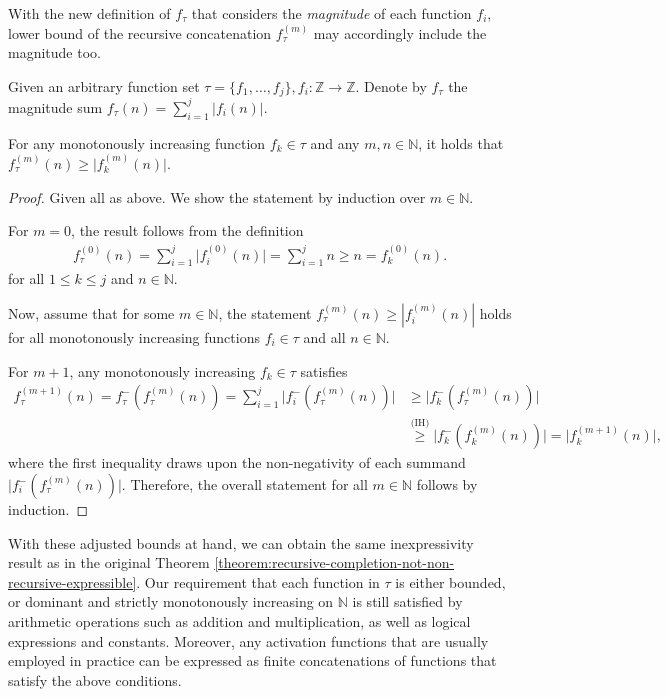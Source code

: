 With the new definition of $f_{\tau}$ that considers the \textit{magnitude} of each function $f_i$, lower bound of the recursive concatenation $f_{\tau}^{(m)}$ may accordingly include the magnitude too.
\begin{lemma}
	\label{lemma:max-bound-recursive-concatenation-sum-integer}
	Given an arbitrary function set $\tau=\{f_1,\dots,f_j\},f_i:\mathbb{Z}\to\mathbb{Z}$.
	Denote by $f_{\tau}$ the magnitude sum $f_{\tau}(n)=\sum_{i=1}^{j} \bigl|f_i(n)\bigr|$.
	
	For any monotonously increasing function $f_k\in\tau$ and any $m,n\in\mathbb{N}$, it holds that
	$f_{\tau}^{(m)}(n)\geq \bigl|f_k^{(m)}(n)\bigr|$.
\end{lemma}
\begin{proof}
	Given all as above.
	We show the statement by induction over $m\in\mathbb{N}$.
	
	For $m=0$, the result follows from the definition
	\begin{align*}
		f_{\tau}^{(0)}(n)=\sum_{i=1}^{j} \bigl|f_{i}^{(0)}(n)\bigr|=\sum_{i=1}^{j}n\geq n=f_{k}^{(0)}(n).
	\end{align*}
	for all $1\leq k\leq j$ and $n\in\mathbb{N}$.
	
	Now, assume that for some $m\in\mathbb{N}$, the statement $f_{\tau}^{(m)}(n)\geq |f_i^{(m)}(n)|$ holds for all monotonously increasing functions $f_i\in\tau$ and all $n\in\mathbb{N}$.
	
	For $m+1$, any monotonously increasing $f_k \in \tau$ satisfies
	\begin{align}
		f_{\tau}^{(m+1)}(n) = f_{\tau}^{-}(f_{\tau}^{(m)}(n)) = \sum_{i=1}^{j}\bigl|f_i^{-}(f_{\tau}^{(m)}(n))\bigr|
		&\geq \bigl|f_k^{-}(f_{\tau}^{(m)}(n))\bigr|\\
		&\overset{\text{(IH)}}{\geq} \bigl|f_k^{-}( f_k^{(m)}(n))\bigr| = \bigl|f_k^{(m+1)}(n)\bigr|,
	\end{align}
	where the first inequality draws upon the non-negativity of each summand $\bigl|f_i^{-}(f_{\tau}^{(m)}(n))\bigr|$.
	Therefore, the overall statement for all $m\in\mathbb{N}$ follows by induction.	
	
\end{proof}
With these adjusted bounds at hand, we can obtain the same inexpressivity result as in the original Theorem \ref{theorem:recursive-completion-not-non-recursive-expressible}.
Our requirement that each function in $\tau$ is either bounded, or dominant and strictly monotonously increasing on $\mathbb{N}$ is still satisfied by arithmetic operations such as addition and multiplication, as well as logical expressions and constants.
Moreover, any activation functions that are usually employed in practice can be expressed as finite concatenations of functions that satisfy the above conditions.

